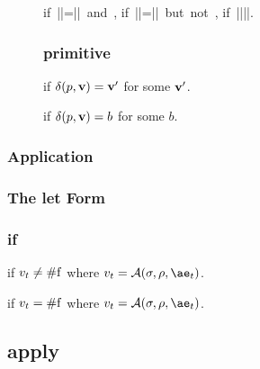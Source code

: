 \begin{figure*}


\redthr{\sval{\chacrk{\vv}::\ks}{\sigma}{\vvp}}
       {\sval{\ks}{\sigma}{\vvp}}{\mbox{if }|\vv|=|\vvp|\mbox{ and }\chapof{\vvp}{\vv}\mbox{,}}
       {\serr{\ks}{\sigma}{\chablame{\ell}}}{\mbox{if }|\vv|=|\vvp|\mbox{ but not }\chapof{\vvp}{\vv}\mbox{,}}
       {\serr{\ks}{\sigma}{\impblame{\ell}}}{\mbox{if }|\vv|\ne|\vvp|\mbox{.}}

\subsubsection{primitive}
if $\delta(p,\mathbf{v})=\mathbf{v'}$ for some $\mathbf{v'}$.

if $\delta(p,\mathbf{v})=b$ for some $b$.
\end{figure*}











\subsubsection{Application}

\subsubsection{The let Form}

\subsubsection{if}

if $v_t\ne\mathrm{\#f}$
where $v_t=\A{\sigma}{\rho}{\ae_t}$.

if $v_t=\mathrm{\#f}$
where $v_t=\A{\sigma}{\rho}{\ae_t}$.

\subsection{apply}


